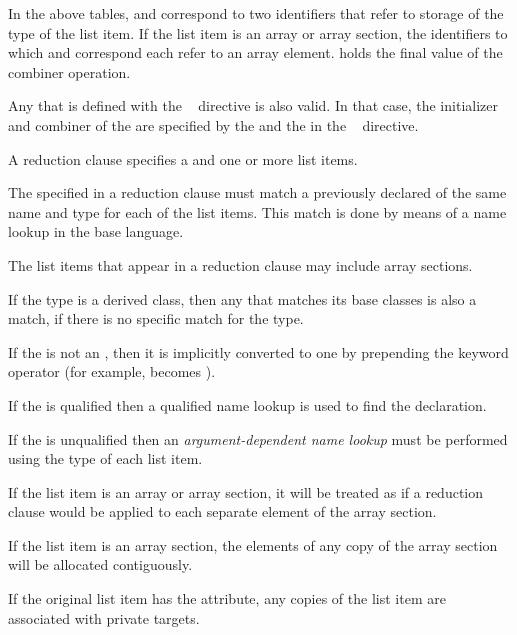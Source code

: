 In the above tables,  and  correspond to two
identifiers that refer to storage of the type of the list item. If the
list item is an array or array section, the identifiers to which  and
 correspond each refer to an array element.
 holds the final value of the combiner operation.

Any  that is defined with the ~
directive is also valid. In that case, the initializer and combiner of the
 are specified by the  and
the  in the ~ directive.

\descr
A reduction clause specifies a  and one or more list
items.

The  specified in a reduction clause must match a
previously declared  of the same name and type for
each of the list items. This match is done by means of a name lookup in the
base language.

The list items that appear in a reduction clause may include array sections.

\begin{cppspecific}
If the type is a derived class, then any  that matches 
its base classes is also a match, if there is no specific match for the type.

If the  is not an , then it is
implicitly converted to one by prepending the keyword operator (for example,
\code{+} becomes {\code{+}}).

If the  is qualified then a qualified name lookup is
used to find the declaration.

If the  is unqualified then an 
\emph{argument-dependent name lookup} must be performed using the 
type of each list item.
\end{cppspecific}

If the list item is an array or array section, it will be treated as
if a reduction clause would be applied to each separate element
of the array section.

If the list item is an array section, the elements of any copy of the 
array section will be allocated contiguously.

\begin{samepage}
\begin{fortranspecific}
If the original list item has the  attribute, any copies of
the list item are associated with private targets.
\end{fortranspecific}
\end{samepage}

